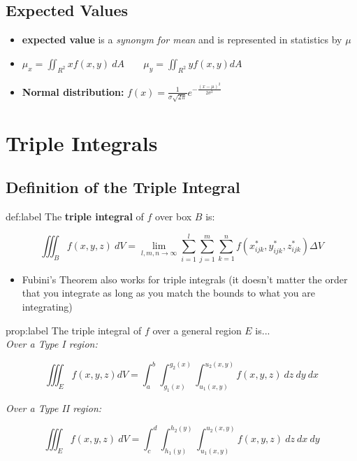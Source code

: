 \documentclass{package/notes}
\begin{document}
\subsection{Expected Values}

\begin{itemize}
	\item \textbf{expected value} is a \textit{synonym for mean} and is represented in statistics by $\mu$
	\item $\mu_x=\iint_{R^2}xf(x,y)\:dA\;\;\;\;\;\;\;\mu_y=\iint_{R^2}yf(x,y)dA$
	\item \textbf{Normal distribution:} $f(x) = \frac{1}{\sigma\sqrt{2\pi}}e^{-\frac{(x-\mu)^2}{2\sigma^2}}$
\end{itemize}



\section{Triple Integrals}


\subsection{Definition of the Triple Integral}

\begin{definition}{def:label}
	The \textbf{triple integral} of $f$ over box $B$ is:

	$$\iiint_Bf(x,y,z)\:dV=\lim_{l,m,n\to\infty}\sum_{i=1}^l\sum_{j=1}^{m}\sum_{k=1}^nf(x_{ijk}^*, y_{ijk}^*, z_{ijk}^*)\Delta V$$
\end{definition}

\begin{itemize}
	\item Fubini's Theorem also works for triple integrals (it doesn't matter the order that you integrate as long as you match the bounds to what you are integrating)
\end{itemize}

\begin{proposition}{prop:label}
	The triple integral of $f$ over a general region $E$ is...\\

	\textit{Over a Type I region:}

	$$\iiint_Ef(x,y,z)dV=\int_a^b\int_{g_1(x)}^{g_2(x)}\int_{u_1(x,y)}^{u_2(x,y)}f(x,y,z)\:dz\:dy\:dx$$

	\textit{Over a Type II region:}

	$$\iiint_Ef(x,y,z)\:dV=\int_c^d\int_{h_1(y)}^{h_2(y)}\int_{u_1(x,y)}^{u_2(x,y)}f(x,y,z)\:dz\:dx\:dy$$
\end{proposition}
\end{document}
